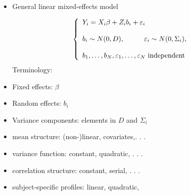 \documentclass{beamer}
\begin{document}
\begin{frame}
\begin{itemize}
\item General linear mixed-effects model

\begin{eqnarray*}
\left\{ \begin{array}{l}
Y_{i} = X_{i} \beta + Z_{i} b_{i} + \varepsilon_{i} \\   \\
b_{i} \sim N(0, D),  \hspace*{1cm} \varepsilon_{i} \sim N(0, \Sigma_{i}),  \\   \\
b_{1}, \ldots, b_{N}, \varepsilon_{1}, \ldots, \varepsilon_{N} \mbox{ independent}
\end{array} \right.
\end{eqnarray*}
Terminology:
\item Fixed effects: $ \beta $
\item Random effects: $ b_{i} $
\item Variance components: elements in $ D $ and $ \Sigma_{i}$
\end{itemize}
\end{frame}

\begin{frame}
\vspace*{3mm}
\begin{itemize}
\item mean structure: (non-)linear, covariates,. . . \vspace{0.25cm}
\item variance function: constant, quadratic, . . . \vspace{0.25cm}
\item correlation structure: constant, serial, . . . \vspace{0.25cm}
\item subject-specific profiles: linear, quadratic,
\end{itemize}
\end{frame}
\end{document}
